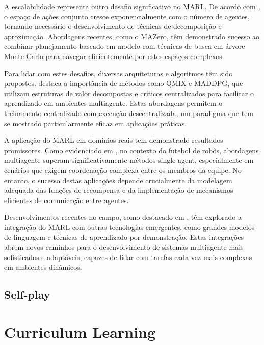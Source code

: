 A escalabilidade representa outro desafio significativo no MARL. De acordo com \cite{https://openreview.net/forum?id=CpnKq3UJwp}, o espaço de ações conjunto cresce exponencialmente com o número de agentes, tornando necessário o desenvolvimento de técnicas de decomposição e aproximação. Abordagens recentes, como o MAZero, têm demonstrado sucesso ao combinar planejamento baseado em modelo com técnicas de busca em árvore Monte Carlo para navegar eficientemente por estes espaços complexos.

Para lidar com estes desafios, diversas arquiteturas e algoritmos têm sido propostos. \cite{https://www.maxwell.vrac.puc-rio.br/21194/21194_3.PDF} destaca a importância de métodos como QMIX e MADDPG, que utilizam estruturas de valor decompostas e críticos centralizados para facilitar o aprendizado em ambientes multiagente. Estas abordagens permitem o treinamento centralizado com execução descentralizada, um paradigma que tem se mostrado particularmente eficaz em aplicações práticas.

A aplicação do MARL em domínios reais tem demonstrado resultados promissores. Como evidenciado em \cite{https://bdtd.ibict.br/vufind/Record/UFPE_b675a4ea6b1a1cb60a873b1d5bc3f9b2}, no contexto do futebol de robôs, abordagens multiagente superam significativamente métodos single-agent, especialmente em cenários que exigem coordenação complexa entre os membros da equipe. No entanto, o sucesso destas aplicações depende crucialmente da modelagem adequada das funções de recompensa e da implementação de mecanismos eficientes de comunicação entre agentes.

Desenvolvimentos recentes no campo, como destacado em \cite{https://arxiv.org/abs/2312.10256}, têm explorado a integração do MARL com outras tecnologias emergentes, como grandes modelos de linguagem e técnicas de aprendizado por demonstração. Estas integrações abrem novos caminhos para o desenvolvimento de sistemas multiagente mais sofisticados e adaptáveis, capazes de lidar com tarefas cada vez mais complexas em ambientes dinâmicos.

\subsection{Self-play}
\label{subsec:self_play}

\section{Curriculum Learning}
\label{sec:curriculum}


